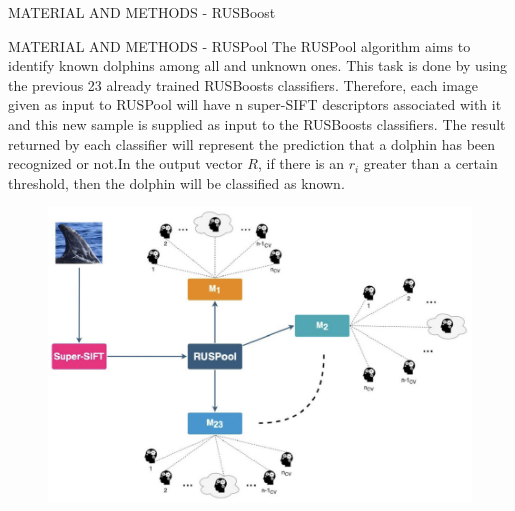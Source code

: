 \begin{frame}{MATERIAL AND METHODS - RUSBoost}
\begin{minipage}{\linewidth}
\begin{minipage}{0.45\linewidth}
\begin{figure}[h!]
                \centering
            \end{figure}
        \end{minipage}
    \end{minipage}
\end{frame}

\begin{frame}{MATERIAL AND METHODS - RUSPool}
    The RUSPool algorithm aims to identify known dolphins among all and unknown 
    ones. This task is done by using the previous 23 already trained 
    RUSBoosts classifiers. Therefore, each image given as input to RUSPool 
    will have n super-SIFT descriptors associated with it and this new sample is 
    supplied as input to the RUSBoosts classifiers. The result returned by each 
    classifier will represent the prediction that a dolphin has been recognized or 
    not.In the output vector $R$, if there is an $r_i$ greater than a certain threshold, then the dolphin will be classified as known.
    \begin{minipage}{\linewidth}
        \centering
        \begin{minipage}{0.47\linewidth}
            \begin{figure}[h!]
                \centering
                \includegraphics[width =\linewidth]{images/paper10/RUSPool Architecture.png}
                \centering
            \end{figure}
        \end{minipage}
        \hspace{0.05\linewidth}
        \begin{minipage}{0.45\linewidth}
            \begin{figure}[h!]

\end{figure}
\end{minipage}
\end{minipage}
\end{frame}
